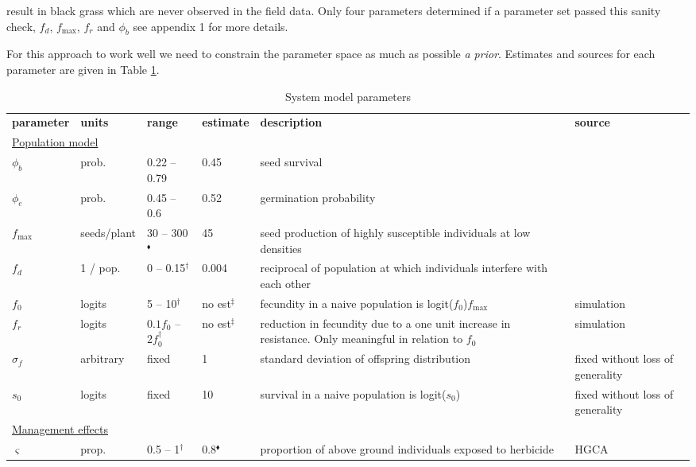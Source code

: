 \documentclass[10pt,letterpaper]{article}
\begin{document}
result in black grass which are never observed in the field data. Only four parameters determined if a parameter set passed this sanity check, $f_d$, $f_\text{max}$, $f_r$ and $\phi_b$ see appendix 1 for more details.

For this approach to work well we need to constrain the parameter space as much as possible \textit{a prior}. Estimates and sources for each parameter are given in Table \ref{tab:parameters}.          

\begin{longtable}[h]{p{1.5cm} p{2cm} p{2.1cm} p{1.5cm} p{3.5cm} p{3cm}} \label{tab:parameters}\\
\caption{System model parameters}\\
	\hline
	\textbf{parameter} & \textbf{units} & \textbf{range} & \textbf{estimate} & \textbf{description} & \textbf{source}\\
	\hline
	\multicolumn{6}{l}{\underline{Population model}}\\
	$\phi_b$ & prob. & 0.22 -- 0.79 & 0.45 & seed survival & \cite{Thom1997}\\
	$\phi_e$ & prob. & 0.45 -- 0.6 & 0.52 & germination probability & \cite{Colb2006}\\	
	$f_\text{max}$ & seeds/plant & 30 -- 300$^\blacklozenge$ & 45 & seed production of highly susceptible individuals at low densities & \cite{Doyl1986}\\
	$f_d$ & 1 / pop. & 0 -- 0.15$^\dag$ & 0.004 & reciprocal of population at which individuals interfere with each other & \cite{Doyl1986}\\ 
	$f_0$ & logits & 5 -- 10$^\dag$ & no est$^\ddag$  & fecundity in a naive population is logit($f_0$)$f_\text{max}$ & simulation\\
	$f_r$ & logits & $0.1f_0$ -- $2f_0 ^\dag$ & no est$^\ddag$ & reduction in fecundity due to a one unit increase in resistance. Only meaningful in relation to $f_0$ & simulation\\
	$\sigma_f$ & arbitrary & fixed & 1 & standard deviation of offspring distribution & fixed without loss of generality\\
	$s_0$ & logits & fixed & 10 & survival in a naive population is logit($s_0$) & fixed without loss of generality\\
	\multicolumn{6}{l}{\underline{Management effects}}\\
	$\varsigma$ & prop. & 0.5 -- 1$^\dag$ & 0.8$^\blacklozenge$ & proportion of above ground individuals exposed to herbicide & HGCA\\   		

\end{longtable}
\end{document}
